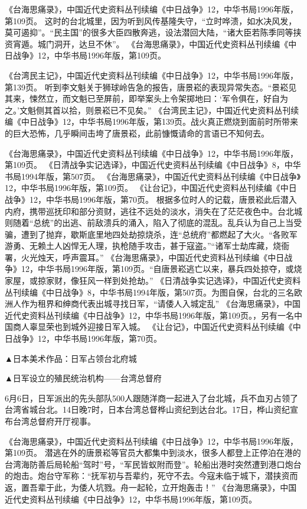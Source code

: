 \documentclass[12pt,UTF8]{ctexbook}
\begin{document}
《台海思痛录》，中国近代史资料丛刊续编《中日战争》12，中华书局1996年版，第109页。
这时的台北城里，因为听到风传基隆失守，“立时哗溃，如水决风发，莫可遏抑”。“民主国”的很多大臣四散奔逃，设法潜回大陆，“诸大臣若陈季同等挟资宵遁。城门洞开，达旦不休”。 《台海思痛录》，中国近代史资料丛刊续编《中日战争》12，中华书局1996年版，第109页。

《台湾民主记》，中国近代史资料丛刊续编《中日战争》12，中华书局1996年版，第139页。
听到李文魁关于狮球岭告急的报告，唐景崧的表现异常失态。“景崧见其来，悚然立，而文魁已至屏前，即举案头上令架掷地曰：‘军令俱在，好自为之。’文魁侧其首以拾，则景崧已不见矣。” 《台湾民主记》，中国近代史资料丛刊续编《中日战争》12，中华书局1996年版，第139页。战火真正燃烧到面前时所带来的巨大恐怖，几乎瞬间击垮了唐景崧，此前慷慨请命的言语已不知何去。

《台海思痛录》，中国近代史资料丛刊续编《中日战争》12，中华书局1996年版，第109页。
《日清战争实记选译》，中国近代史资料丛刊续编《中日战争》8，中华书局1994年版，第507页。
《台海思痛录》，中国近代史资料丛刊续编《中日战争》12，中华书局1996年版，第109页。
《让台记》，中国近代史资料丛刊续编《中日战争》12，中华书局1996年版，第70页。
根据多位时人的记载，唐景崧此后潜入内府，携带巡抚印和部分资财，逃往不远处的淡水，消失在了茫茫夜色中。台北城则随着“总统”的出逃、前敌溃兵的涌入，陷入了彻底的混乱。乱兵认为自己上当受骗，遭到了抛弃，歇斯底里地四处劫掠烧杀，连“总统府”都燃起了大火。“各败军游勇、无赖土人凶悍无人理，执枪随手攻击，甚于寇盗。”“诸军士劫库藏，烧衙署，火光烛天，呼声震耳。” 《台海思痛录》，中国近代史资料丛刊续编《中日战争》12，中华书局1996年版，第109页。“自唐景崧逃亡以来，暴兵四处掠夺，或烧家屋，或掠家财，像狂风一样到处抢劫。” 《日清战争实记选译》，中国近代史资料丛刊续编《中日战争》8，中华书局1994年版，第507页。为图自保，台北的三名欧洲人作为租界和绅商代表出城寻找日军，“请倭人入城定乱” 《台海思痛录》，中国近代史资料丛刊续编《中日战争》12，中华书局1996年版，第109页。，另有一名中国商人辜显荣也到城外迎接日军入城。 《让台记》，中国近代史资料丛刊续编《中日战争》12，中华书局1996年版，第70页。


▲日本美术作品：日军占领台北府城


▲日军设立的殖民统治机构——台湾总督府

6月6日，日军派出的先头部队500人跟随洋商一起进入了台北城，兵不血刃占领了台湾省城台北。14日晚7时，日本台湾总督桦山资纪到达台北。17日，桦山资纪宣布台湾总督府开厅视事。

《台海思痛录》，中国近代史资料丛刊续编《中日战争》12，中华书局1996年版，第109页。
潜逃在外的唐景崧等官员大都集中到淡水，很多人都登上正停泊在港的台湾海防善后局轮船“驾时”号，“军民皆蚁附而登”。轮船出港时突然遭到港口炮台的炮击。炮台守军称：“抚军初与吾辈约，死守不去。今寇未临于城下，潜挟资而返，置吾辈于此，为倭人坑戮。舟一起轮，立开炮轰击！” 《台海思痛录》，中国近代史资料丛刊续编《中日战争》12，中华书局1996年版，第109页。
\end{document}
